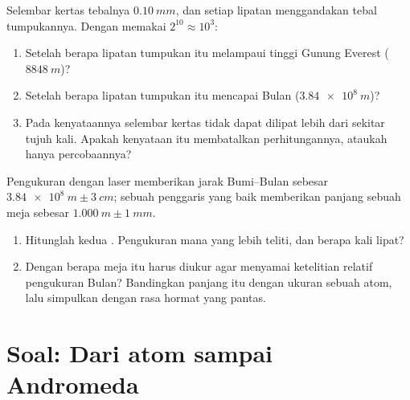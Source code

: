 \begin{exercise}[$\star\star\star$]\label{exo:g10:orders-of-magnitude:14}
Selembar kertas tebalnya $\qty{0.10}{mm}$, dan setiap lipatan
menggandakan tebal tumpukannya. Dengan memakai
$2^{10} \approx 10^{3}$:
\begin{enumerate}
  \item Setelah berapa lipatan tumpukan itu melampaui tinggi Gunung
        Everest ($\qty{8848}{m}$)?
  \item Setelah berapa lipatan tumpukan itu mencapai Bulan
        ($\qty{3.84e8}{m}$)?
  \item Pada kenyataannya selembar kertas tidak dapat dilipat lebih
        dari sekitar tujuh kali. Apakah kenyataan itu membatalkan
        perhitungannya, ataukah hanya percobaannya?
\end{enumerate}
\end{exercise}

\begin{exercise}[$\star\star\star$]\label{exo:g10:orders-of-magnitude:15}
Pengukuran dengan laser memberikan jarak Bumi--Bulan sebesar
$\qty{3.84e8}{m} \pm \qty{3}{cm}$; sebuah penggaris yang baik
memberikan panjang sebuah meja sebesar
$\qty{1.000}{m} \pm \qty{1}{mm}$.
\begin{enumerate}
  \item Hitunglah kedua . Pengukuran mana yang
        lebih teliti, dan berapa kali lipat?
  \item Dengan  berapa meja itu harus diukur agar
        menyamai ketelitian relatif pengukuran Bulan? Bandingkan
        panjang itu dengan ukuran sebuah atom, lalu simpulkan dengan
        rasa hormat yang pantas.
\end{enumerate}
\end{exercise}

\section{Soal: Dari atom sampai Andromeda}

